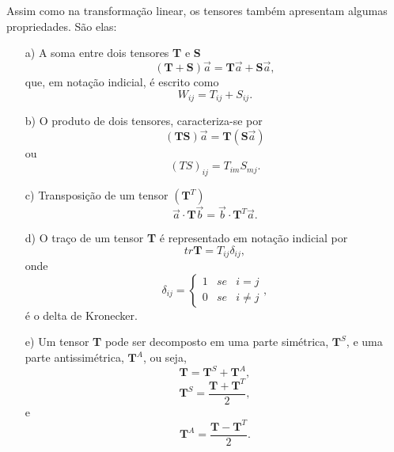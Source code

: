 Assim como na transformação linear, os tensores também apresentam algumas propriedades. São elas:
\begin{enumerate}
	\item[a)] A soma entre dois tensores \textbf{T} e \textbf{S}
	\begin{equation}
		( \textbf{T} + \textbf{S}) \vec{a} = \textbf{T} \vec{a} + \textbf{S} \vec{a}, 
	\end{equation}
	que, em notação indicial, é escrito como
	\begin{equation}
		W_{ij} = T_{ij} + S_{ij}.
	\end{equation}
	\item[b)] O produto de dois tensores, caracteriza-se por
	\begin{equation}
		( \textbf{T} \textbf{S}) \vec{a} = \textbf{T} ( \textbf{S} \vec{a})
	\end{equation}
	ou
	\begin{equation}
		(TS)_{ij} = T_{im} S_{mj}.
	\end{equation}
	\item[c)] Transposição de um tensor $( \textbf{T} ^{T})$
	\begin{equation}
		\vec{a} \cdot \textbf{T} \vec{b} = \vec{b} \cdot \textbf{T} ^{T} \vec{a}.
	\end{equation}
	\item[d)] O traço de um tensor \textbf{T} é representado em notação indicial por
	\begin{equation}
		tr \textbf{T} = T_{ij} \delta _{ij},
	\end{equation}
	onde
	\begin{equation}
		\delta _{ij} = \left\{
		\begin{array}{rcl}
			1 & se & i = j\\
			0 & se & i \neq j
		\end{array} \right.,
	\end{equation}
	é o delta de Kronecker.
	\item[e)] Um tensor \textbf{T} pode ser decomposto em uma parte simétrica, $ \textbf{T} ^{S} $, e uma parte antissimétrica, $ \textbf{T} ^{A} $, ou seja,
	\begin{equation}
		\textbf{T} = \textbf{T} ^{S} + \textbf{T} ^{A},
	\end{equation}
	\begin{equation}
		\textbf{T} ^{S} = \dfrac{ \textbf{T} + \textbf{T} ^{T}}{2},
	\end{equation}
	e
	\begin{equation}
		\textbf{T} ^{A} = \dfrac{ \textbf{T} - \textbf{T} ^{T}}{2}.
	\end{equation}
\end{enumerate}

